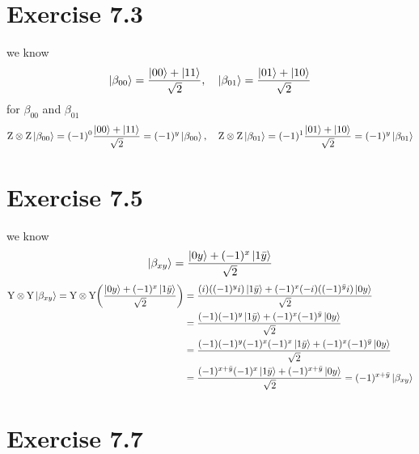\documentclass{article}
\newcommand{\tensor}[2]{#1 \otimes #2}
\begin{document}
\section*{Exercise 7.3}
we know
\begin{align*}
   \ket{\beta_{00}} = \frac{\ket{00}+\ket{11}}{\sqrt{2}}, \quad  \ket{\beta_{01}} = \frac{\ket{01}+\ket{10}}{\sqrt{2}}
\end{align*}
for $\beta_{00}$ and $\beta_{01}$ 
\begin{align*}
    \tensor{\text{Z}}{\text{Z}}\ket{\beta_{00}} = (-1)^0\frac{\ket{00}+\ket{11}}{\sqrt{2}} = (-1)^{y}\ket{\beta_{00}}, \quad \tensor{\text{Z}}{\text{Z}}\ket{\beta_{01}} = (-1)^1\frac{\ket{01}+\ket{10}}{\sqrt{2}} = (-1)^{y}\ket{\beta_{01}}
\end{align*}
\section*{Exercise 7.5}
we know
\begin{align*}
    \ket{\beta_{xy}} = \frac{\ket{0y}+(-1)^{x}\ket{1\bar{y}}}{\sqrt{2}}
\end{align*}
\begin{align*}
    \tensor{\text{Y}}{\text{Y}}\ket{\beta_{xy}} =  \tensor{\text{Y}}{\text{Y}}\bigg(\frac{\ket{0y}+(-1)^{x}\ket{1\bar{y}}}{\sqrt{2}}\bigg) &= \frac{(i)((-1)^{y}i)\ket{1\bar{y}}+(-1)^{x}(-i)((-1)^{\bar{y}}i)\ket{0y}}{\sqrt{2}} \\
    &= \frac{(-1)(-1)^{y}\ket{1\bar{y}}+(-1)^{x}(-1)^{\bar{y}}\ket{0y}}{\sqrt{2}} \\
    &= \frac{(-1)(-1)^{y}(-1)^{x}(-1)^{x}\ket{1\bar{y}}+(-1)^{x}(-1)^{\bar{y}}\ket{0y}}{\sqrt{2}} \\
    &= \frac{(-1)^{x+\bar{y}}(-1)^{x}\ket{1\bar{y}}+(-1)^{x+\bar{y}}\ket{0y}}{\sqrt{2}} = (-1)^{x+\bar{y}}\ket{\beta_{xy}}
\end{align*}
\section*{Exercise 7.7}
\end{document}
